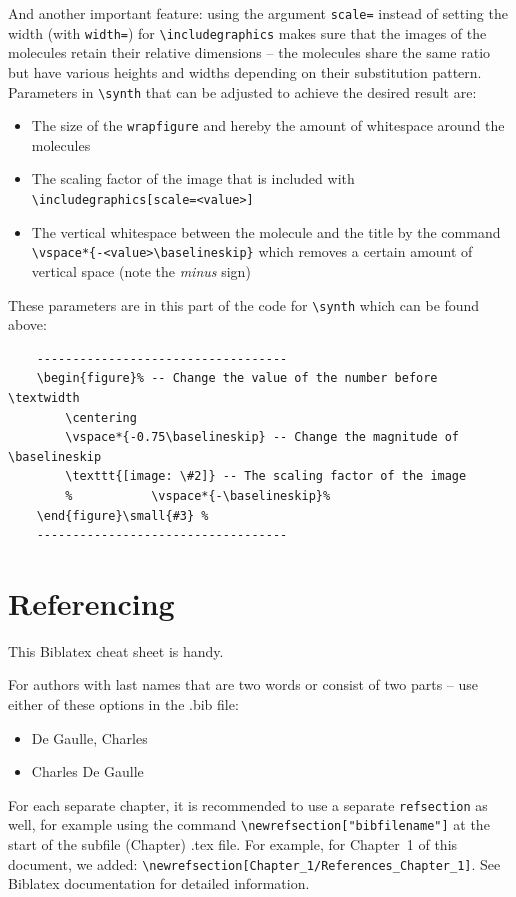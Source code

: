 \documentclass[main_brownies.tex]{subfiles}
\begin{document}
And another important feature: using the argument \verb*|scale=| instead of setting the width (with \verb*|width=|) for \verb*|\includegraphics| makes sure that the images of the molecules retain their relative dimensions -- the molecules share the same ratio but have various heights and widths depending on their substitution pattern.
Parameters in \verb*|\synth| that can be adjusted to achieve the desired result are:
\begin{itemize}
	\item The size of the \verb*|wrapfigure| and hereby the amount of whitespace around the molecules
	\item The scaling factor of the image that is included with \verb*|\includegraphics[scale=<value>]|
	\item The vertical whitespace between the molecule and the title by the command \verb*|\vspace*{-<value>\baselineskip}| which removes a certain amount of vertical space (note the \textit{minus} sign)
\end{itemize}
These parameters are in this part of the code for \verb*|\synth| which can be found above:
{\small
\begin{verbatim}
	-----------------------------------
	\begin{figure}% -- Change the value of the number before \textwidth
		\centering
		\vspace*{-0.75\baselineskip} -- Change the magnitude of \baselineskip
		\texttt{[image: \#2]} -- The scaling factor of the image
		%			\vspace*{-\baselineskip}%
	\end{figure}\small{#3} %
	-----------------------------------
\end{verbatim}
}

\section{Referencing}
This Biblatex cheat sheet is handy.\cite{BiblatexCheatSheet}

For authors with last names that are two words or consist of two parts -- use either of these options in the .bib file:\cite{BibTwowordlastname}
\begin{itemize}
	\item De Gaulle, Charles
	\item Charles {De Gaulle}
\end{itemize}

For each separate chapter, it is recommended to use a separate \verb*|refsection| as well, for example using the command \verb*|\newrefsection["bibfilename"]| at the start of the subfile (Chapter) .tex file. For example, for Chapter~1 of this document, we added: \verb*|\newrefsection[Chapter_1/References_Chapter_1]|. See Biblatex documentation for detailed information.\cite{BiblatexDocumentation}


{\raggedright
	\printbibliography} %
\end{document}
